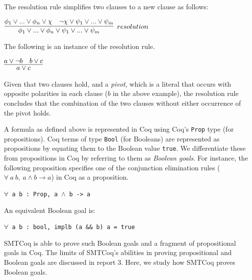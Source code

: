 \documentclass{article}
\begin{document}
	\noindent The resolution rule simplifies two 
	clauses to a new clause as follows:
	\begin{center}
		$\infer[resolution]{\phi_1 \lor ... \lor 
			\phi_n \lor \psi_1 \lor ... \lor 
			\psi_m}{\phi_1 \lor ... \lor \phi_n 
			\lor \chi & \neg \chi \lor \psi_1 
			\lor ... \lor \psi_m}$ 
	\end{center}
	The following is an instance of the 
	resolution rule.
	\begin{center}
		$\infer{a \lor c}{a \lor \neg b 
			& b \lor c}$
	\end{center}
	Given that two clauses hold, 
	and a \textit{pivot}, which is a 
	literal that occurs with opposite 
	polarities in each clause ($b$ in 
	the above example), the resolution 
	rule concludes that 
	the combination of the two clauses 
	without either occurrence of the 
	pivot holds.
	
	A formula as defined above is 
	represented in Coq using Coq's
	\texttt{Prop} type (for 
	propositions). Coq terms 
	of type \texttt{Bool} (for 
	Booleans) are represented as 
	propositions by equating them 
	to the Boolean value \texttt{true}.
	We differentiate these from 
	propositions in Coq by referring to 
	them as \textit{Boolean goals}.
	For instance, the following 
	proposition specifies one of the 
	conjunction elimination rules
	($\forall\ a\ b,\ a \land b \to a$) in 
	Coq as a proposition.
	\begin{center}
		\texttt{$\forall$ a b : Prop,
			a $\land$ b -> a}
	\end{center}
	An equivalent Boolean goal is:
	\begin{center}
		\texttt{$\forall$ a b : bool,
			implb (a \&\& b) a = true}
	\end{center}
	SMTCoq is able to prove such Boolean 
	goals and a fragment of propositional
	goals in Coq. The limits of SMTCoq's 
	abilities in proving propositional and 
	Boolean goals are discussed in report 3. 
	Here, we study how SMTCoq proves Boolean 
	goals. 
	
\end{document}

